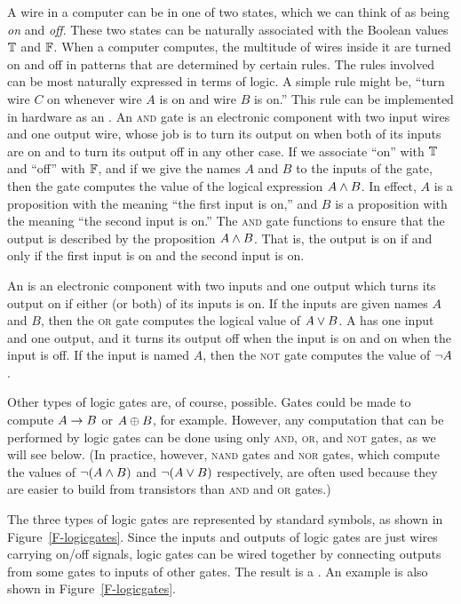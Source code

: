 A wire in a computer can be in one of two states, which we can
think of as being \emph{on} and \emph{off}.  These two states 
can be naturally associated with the Boolean values $\mathbb{T}$ and $\mathbb{F}$.
When a computer computes, the multitude of wires inside it are
turned on and off in patterns that are determined by certain rules.
The rules involved can be most naturally expressed in terms of logic.
A simple rule might be, ``turn wire $C$ on whenever wire $A$ is on
and wire $B$ is on.''  This rule can be implemented in hardware as
an .  An \textsc{and} gate is an electronic 
component with two input wires and one output wire, whose job is
to turn its output on when both of its inputs are on and to turn
its output off in any other case.  If we associate ``on'' with
$\mathbb{T}$ and ``off'' with $\mathbb{F}$, and if we give the names $A$ and $B$ to
the inputs of the gate, then the gate computes the value of the
logical expression $A\wedge B$.  In effect, $A$ is a proposition
with the meaning ``the first input is on,'' and $B$ is a proposition
with the meaning ``the second input is on.''  The \textsc{and} gate
functions to ensure that the output is described by the 
proposition $A \wedge B$.  That is, the output is on if and only if
the first input is on and the second input is on.

An  is an electronic component with two inputs
and one output which turns its output on if either (or both) of its
inputs is on.  If the inputs are given names $A$ and $B$, then
the \textsc{or} gate computes the logical value of $A\vee B$.
A  has one input and one output, and it turns
its output off when the input is on and on when the input is off.
If the input is named $A$, then the \textsc{not} gate computes the
value of $\lnot A$.

Other types of logic gates are, of course, possible.  Gates could
be made to compute $A\rightarrow B$ or $A\oplus B$, for example.  However,
any computation that can be performed by logic gates can be 
done using only \textsc{and}, \textsc{or}, and \textsc{not} gates,
as we will see below.  (In practice, however, \textsc{nand} gates and
\textsc{nor} gates, which compute the values of $\lnot(A\wedge B)$
and $\lnot(A\vee B)$ respectively, are often used because they
are easier to build from transistors than \textsc{and} and \textsc{or}
gates.)

The three types of logic gates are represented by standard symbols,
as shown in Figure~\ref{F-logicgates}.  Since the inputs and outputs
of logic gates are just wires carrying on/off signals, logic gates
can be wired together by connecting outputs from some gates to
inputs of other gates.  The result is a .
An example is also shown in Figure~\ref{F-logicgates}.

